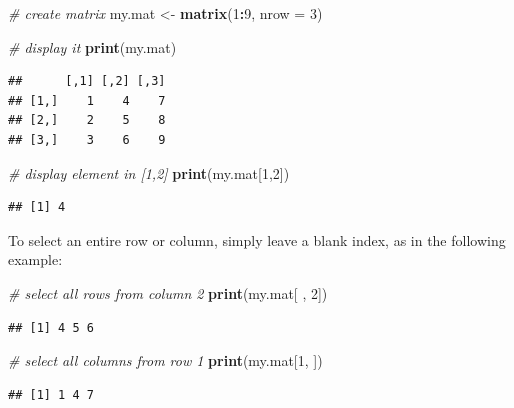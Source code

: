 \documentclass[11pt,]{book}
\newenvironment{Shaded}{\begin{snugshade}}{\end{snugshade}}
\newcommand{\KeywordTok}[1]{\textcolor[rgb]{0.27,0.27,0.27}{\textbf{#1}}}
\newcommand{\DataTypeTok}[1]{\textcolor[rgb]{0.27,0.27,0.27}{#1}}
\newcommand{\DecValTok}[1]{\textcolor[rgb]{0.06,0.06,0.06}{#1}}
\newcommand{\StringTok}[1]{\textcolor[rgb]{0.5,0.5,0.5}{#1}}
\newcommand{\CommentTok}[1]{\textcolor[rgb]{0.56,0.35,0.01}{\textit{#1}}}
\newcommand{\OperatorTok}[1]{\textcolor[rgb]{0.81,0.36,0.00}{\textbf{#1}}}
\newcommand{\NormalTok}[1]{#1}
\begin{document}
\begin{Shaded}
\begin{Highlighting}[]
\CommentTok{# create matrix}
\NormalTok{my.mat <-}\StringTok{ }\KeywordTok{matrix}\NormalTok{(}\DecValTok{1}\OperatorTok{:}\DecValTok{9}\NormalTok{, }\DataTypeTok{nrow =} \DecValTok{3}\NormalTok{)}

\CommentTok{# display it}
\KeywordTok{print}\NormalTok{(my.mat)}
\end{Highlighting}
\end{Shaded}

\begin{verbatim}
##      [,1] [,2] [,3]
## [1,]    1    4    7
## [2,]    2    5    8
## [3,]    3    6    9
\end{verbatim}

\begin{Shaded}
\begin{Highlighting}[]
\CommentTok{# display element in [1,2]}
\KeywordTok{print}\NormalTok{(my.mat[}\DecValTok{1}\NormalTok{,}\DecValTok{2}\NormalTok{])}
\end{Highlighting}
\end{Shaded}

\begin{verbatim}
## [1] 4
\end{verbatim}

To select an entire row or column, simply leave a blank index, as in the
following example:

\begin{Shaded}
\begin{Highlighting}[]
\CommentTok{# select all rows from column 2}
\KeywordTok{print}\NormalTok{(my.mat[ , }\DecValTok{2}\NormalTok{])}
\end{Highlighting}
\end{Shaded}

\begin{verbatim}
## [1] 4 5 6
\end{verbatim}

\begin{Shaded}
\begin{Highlighting}[]
\CommentTok{# select all columns from row 1}
\KeywordTok{print}\NormalTok{(my.mat[}\DecValTok{1}\NormalTok{, ])}
\end{Highlighting}
\end{Shaded}

\begin{verbatim}
## [1] 1 4 7
\end{verbatim}
\end{document}
